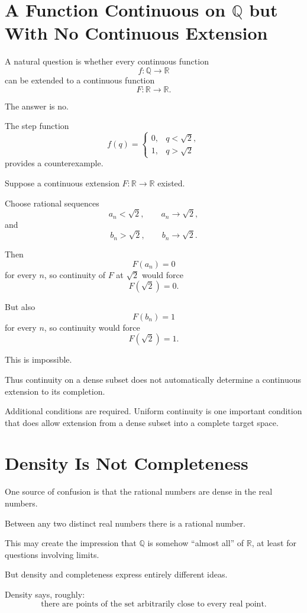 \documentclass{essay}
\begin{document}
\section{A Function Continuous on \(\mathbb{Q}\) but With No Continuous Extension}

A natural question is whether every continuous function
\[ f:\mathbb{Q}\to\mathbb{R} \]
can be extended to a continuous function
\[ F:\mathbb{R}\to\mathbb{R}. \]

The answer is no.

The step function
\[
  f(q)=
  \begin{cases}
    0,&q<\sqrt{2},\\
    1,&q>\sqrt{2}
  \end{cases}
\]
provides a counterexample.

Suppose a continuous extension \(F:\mathbb{R}\to\mathbb{R}\) existed.

Choose rational sequences
\[ a_{n}<\sqrt{2}, \qquad a_{n}\to\sqrt{2}, \]
and
\[ b_{n}>\sqrt{2}, \qquad b_{n}\to\sqrt{2}. \]

Then
\[ F(a_{n})=0 \]
for every \(n\), so continuity of \(F\) at \(\sqrt{2}\) would force
\[ F(\sqrt{2})=0. \]

But also
\[ F(b_{n})=1 \]
for every \(n\), so continuity would force
\[ F(\sqrt{2})=1. \]

This is impossible.

Thus continuity on a dense subset does not automatically determine a
continuous extension to its completion.

Additional conditions are required. Uniform continuity is one important
condition that does allow extension from a dense subset into a complete target
space.

\section{Density Is Not Completeness}

One source of confusion is that the rational numbers are dense in the real
numbers.

Between any two distinct real numbers there is a rational number.

This may create the impression that \(\mathbb{Q}\) is somehow ``almost all''
of \(\mathbb{R}\), at least for questions involving limits.

But density and completeness express entirely different ideas.

Density says, roughly:
\[ \text{there are points of the set arbitrarily close to every real point.} \]
\end{document}
